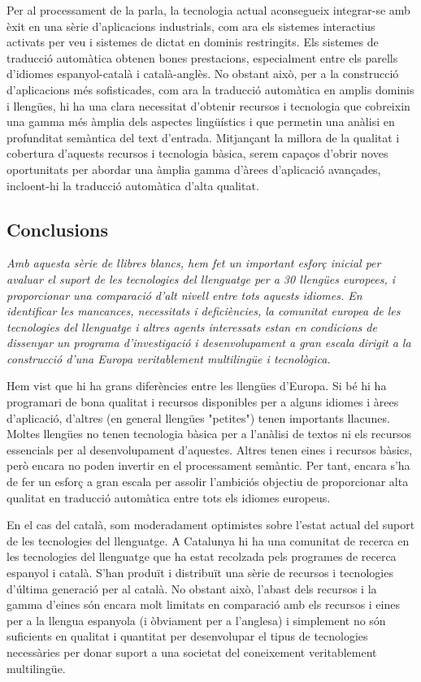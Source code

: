 \begin{multicols}{2}
Per al processament de la parla, la tecnologia actual aconsegueix integrar-se amb èxit en una sèrie d'aplicacions industrials, com ara els sistemes interactius activats per veu i sistemes de dictat en dominis restringits. Els sistemes de traducció automàtica obtenen bones prestacions, especialment entre els parells d'idiomes espanyol-català i català-anglès. No obstant això, per a la construcció d'aplicacions més sofisticades, com ara la traducció automàtica en amplis dominis i llengües, hi ha una clara necessitat d'obtenir recursos i tecnologia que cobreixin una gamma més àmplia dels aspectes lingüístics i que permetin una anàlisi en profunditat semàntica del text d'entrada. Mitjançant la millora de la qualitat i cobertura d'aquests recursos i tecnologia bàsica, serem capaços d'obrir noves oportunitats per abordar una àmplia gamma d'àrees d'aplicació avançades, incloent-hi la traducció automàtica d'alta qualitat.

\subsection{Conclusions}

\emph{Amb aquesta sèrie de llibres blancs, hem fet un important esforç inicial per avaluar el suport de les tecnologies del llenguatge per a 30 llengües europees, i proporcionar una comparació d'alt nivell entre tots aquests idiomes. En identificar les mancances, necessitats i deficiències, la comunitat europea de les tecnologies del llenguatge i altres agents interessats estan en condicions de dissenyar un programa d’investigació i desenvolupament a gran escala dirigit a la construcció d'una Europa veritablement multilingüe i tecnològica.}

Hem vist que hi ha grans diferències entre les llengües d'Europa. Si bé hi ha programari de bona qualitat i recursos disponibles per a alguns idiomes i àrees d'aplicació, d’altres (en general llengües "petites") tenen importants llacunes. Moltes llengües no tenen tecnologia bàsica per a l'anàlisi de textos ni els recursos essencials per al desenvolupament d'aquestes. Altres tenen eines i recursos bàsics, però encara no poden invertir en el processament semàntic. Per tant, encara s'ha de fer un esforç a gran escala per assolir l'ambiciós objectiu de proporcionar alta qualitat en traducció automàtica entre tots els idiomes europeus.

En el cas del català, som moderadament optimistes sobre l'estat actual del suport de les tecnologies del llenguatge. A Catalunya hi ha una comunitat de recerca en les tecnologies del llenguatge que ha estat recolzada pels programes de recerca espanyol i català. S’han produït i distribuït una sèrie de recursos i tecnologies d'última generació per al català. No obstant això, l'abast dels recursos i la gamma d'eines són encara molt limitats en comparació amb els recursos i eines per a la llengua espanyola (i òbviament per a l'anglesa) i simplement no són suficients en qualitat i quantitat per desenvolupar el tipus de tecnologies necessàries per donar suport a una societat del coneixement veritablement multilingüe.


\end{multicols}
